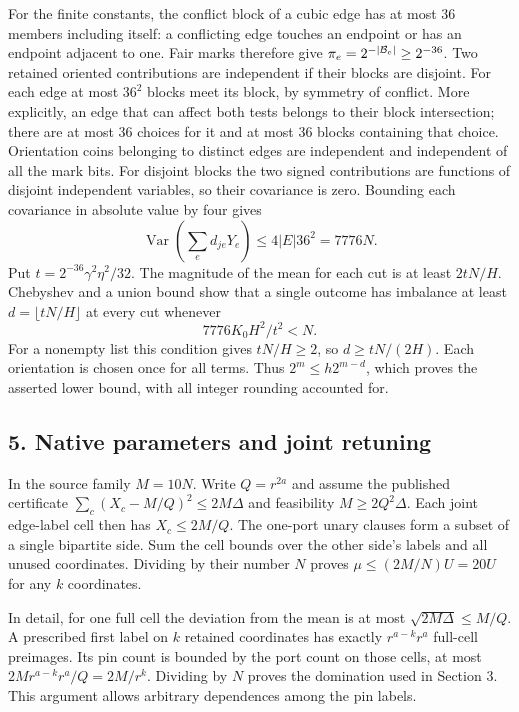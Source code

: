 \documentclass[
  11pt,
]{article}
\newcommand{\floor}[1]{\lfloor #1\rfloor}
\begin{document}
For the finite constants, the conflict block of a cubic edge has at most
36 members including itself: a conflicting edge touches an endpoint or
has an endpoint adjacent to one. Fair marks therefore give
\(\pi_e=2^{-|{\cal B}_e|}\ge2^{-36}\). Two retained oriented contributions
are independent if their blocks are disjoint. For each edge at most \(36^2\)
blocks meet its block, by symmetry of conflict. More explicitly, an
edge that can affect both tests belongs to their block intersection;
there are at most 36 choices for it and at most 36 blocks containing
that choice. Orientation coins belonging to distinct edges are
independent and independent of all the mark bits. For disjoint blocks
the two signed contributions are functions of disjoint independent
variables, so their covariance is zero. Bounding each covariance in
absolute value by four gives
\[
 \operatorname{Var}\!\left(\sum_e d_{je}Y_e\right)
 \le4|E|36^2=7776N .
\]
Put \(t=2^{-36}\gamma^2\eta^2/32\). The magnitude of the mean for each
cut is at least \(2tN/H\). Chebyshev and a union bound show that a single
outcome has imbalance at least \(d=\floor{tN/H}\) at every cut whenever
\[
                    7776K_0 H^2/t^2<N.                 \tag{J}
\]
For a nonempty list this condition gives \(tN/H\ge2\), so
\(d\ge tN/(2H)\). Each orientation is chosen once for all terms.
Thus \(2^m\le h2^{m-d}\), which proves the asserted lower bound,
with all integer rounding accounted for.


\subsection{5. Native parameters and joint
retuning}\label{native-parameters-and-joint-retuning}

In the source family \(M=10N\). Write \(Q=r^{2a}\) and assume the
published certificate \(\sum_c(X_c-M/Q)^2\le2M\Delta\) and feasibility
\(M\ge2Q^2\Delta\). Each joint edge-label cell then has \(X_c\le2M/Q\).
The one-port unary clauses form a subset of a single bipartite side. Sum
the cell bounds over the other side's labels and all unused coordinates.
Dividing by their number \(N\) proves \(\mu\le(2M/N)U=20U\) for any
\(k\) coordinates.

In detail, for one full cell the deviation from the mean is at most
\(\sqrt{2M\Delta}\le M/Q\). A prescribed first label on \(k\) retained
coordinates has exactly \(r^{a-k}r^a\) full-cell preimages. Its pin count
is bounded by the port count on those cells, at most
\(2M r^{a-k}r^a/Q=2M/r^k\). Dividing by \(N\) proves the domination
used in Section 3. This argument allows arbitrary dependences among the
pin labels.
\end{document}
